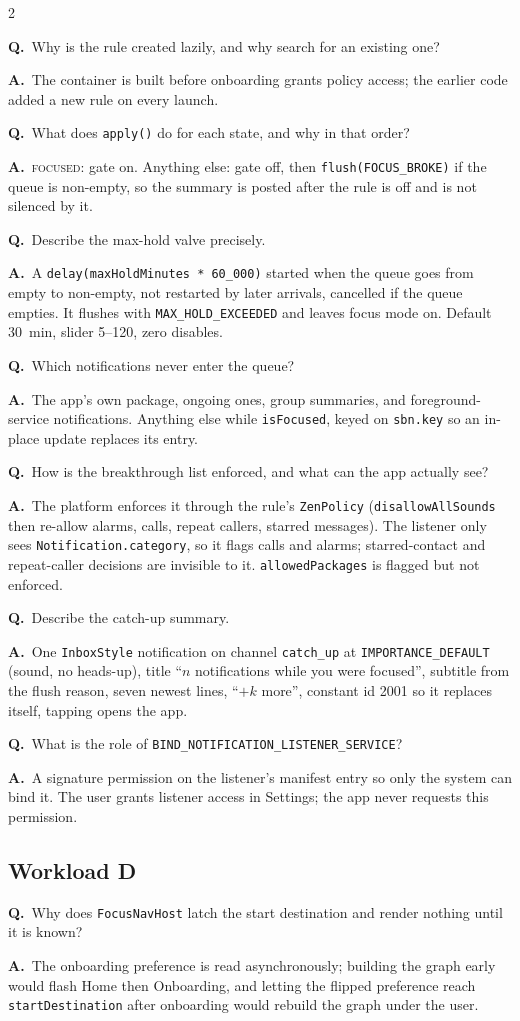 \documentclass[10pt,a4paper]{article}
\newcommand{\code}[1]{\texttt{#1}}                  %
\newcommand{\state}[1]{\textsc{\small #1}}          %
\newcounter{qnum}
\newcommand{\Q}[2]{\stepcounter{qnum}\par\medskip\noindent
  \textbf{Q\theqnum.}\ #1\par\nobreak\smallskip\noindent
  {\color{teal}\textbf{A.}}\ #2\par}
\begin{document}
\begin{multicols}{2}
\Q{Why is the rule created lazily, and why search for an existing one?}{The container is built
before onboarding grants policy access; the earlier code added a new rule on every launch.}

\Q{What does \code{apply()} do for each state, and why in that order?}{\state{focused}: gate on.
Anything else: gate off, then \code{flush(FOCUS\_BROKE)} if the queue is non-empty, so the summary
is posted after the rule is off and is not silenced by it.}

\Q{Describe the max-hold valve precisely.}{A \code{delay(maxHoldMinutes * 60\_000)} started when
the queue goes from empty to non-empty, not restarted by later arrivals, cancelled if the queue
empties. It flushes with \code{MAX\_HOLD\_EXCEEDED} and leaves focus mode on. Default 30~min,
slider 5--120, zero disables.}

\Q{Which notifications never enter the queue?}{The app's own package, ongoing ones, group
summaries, and foreground-service notifications. Anything else while \code{isFocused}, keyed on
\code{sbn.key} so an in-place update replaces its entry.}

\Q{How is the breakthrough list enforced, and what can the app actually see?}{The platform
enforces it through the rule's \code{ZenPolicy} (\code{disallowAllSounds} then re-allow alarms,
calls, repeat callers, starred messages). The listener only sees \code{Notification.category},
so it flags calls and alarms; starred-contact and repeat-caller decisions are invisible to it.
\code{allowedPackages} is flagged but not enforced.}

\Q{Describe the catch-up summary.}{One \code{InboxStyle} notification on channel \code{catch\_up}
at \code{IMPORTANCE\_DEFAULT} (sound, no heads-up), title ``$n$ notifications while you were
focused'', subtitle from the flush reason, seven newest lines, ``$+k$ more'', constant id 2001 so
it replaces itself, tapping opens the app.}

\Q{What is the role of \code{BIND\_NOTIFICATION\_LISTENER\_SERVICE}?}{A signature permission on
the listener's manifest entry so only the system can bind it. The user grants listener access in
Settings; the app never requests this permission.}

\subsection*{Workload D}

\Q{Why does \code{FocusNavHost} latch the start destination and render nothing until it is
known?}{The onboarding preference is read asynchronously; building the graph early would flash
Home then Onboarding, and letting the flipped preference reach \code{startDestination} after
onboarding would rebuild the graph under the user.}


\end{multicols}
\end{document}
